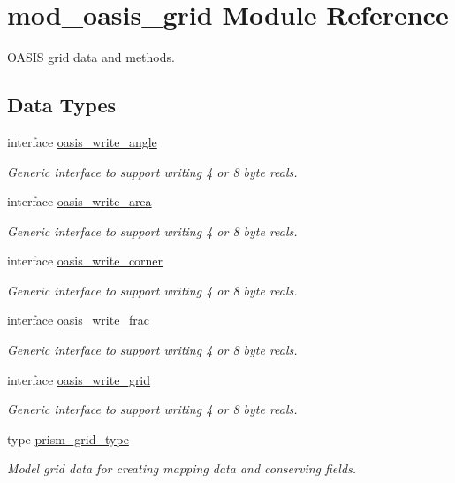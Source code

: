\hypertarget{namespacemod__oasis__grid}{}\section{mod\+\_\+oasis\+\_\+grid Module Reference}
\label{namespacemod__oasis__grid}


O\+A\+S\+IS grid data and methods.  


\subsection*{Data Types}
\begin{DoxyCompactItemize}
\item 
interface \hyperlink{interfacemod__oasis__grid_1_1oasis__write__angle}{oasis\+\_\+write\+\_\+angle}
\begin{DoxyCompactList}\small\item\em Generic interface to support writing 4 or 8 byte reals. \end{DoxyCompactList}\item 
interface \hyperlink{interfacemod__oasis__grid_1_1oasis__write__area}{oasis\+\_\+write\+\_\+area}
\begin{DoxyCompactList}\small\item\em Generic interface to support writing 4 or 8 byte reals. \end{DoxyCompactList}\item 
interface \hyperlink{interfacemod__oasis__grid_1_1oasis__write__corner}{oasis\+\_\+write\+\_\+corner}
\begin{DoxyCompactList}\small\item\em Generic interface to support writing 4 or 8 byte reals. \end{DoxyCompactList}\item 
interface \hyperlink{interfacemod__oasis__grid_1_1oasis__write__frac}{oasis\+\_\+write\+\_\+frac}
\begin{DoxyCompactList}\small\item\em Generic interface to support writing 4 or 8 byte reals. \end{DoxyCompactList}\item 
interface \hyperlink{interfacemod__oasis__grid_1_1oasis__write__grid}{oasis\+\_\+write\+\_\+grid}
\begin{DoxyCompactList}\small\item\em Generic interface to support writing 4 or 8 byte reals. \end{DoxyCompactList}\item 
type \hyperlink{structmod__oasis__grid_1_1prism__grid__type}{prism\+\_\+grid\+\_\+type}
\begin{DoxyCompactList}\small\item\em Model grid data for creating mapping data and conserving fields. \end{DoxyCompactList}\end{DoxyCompactItemize}
